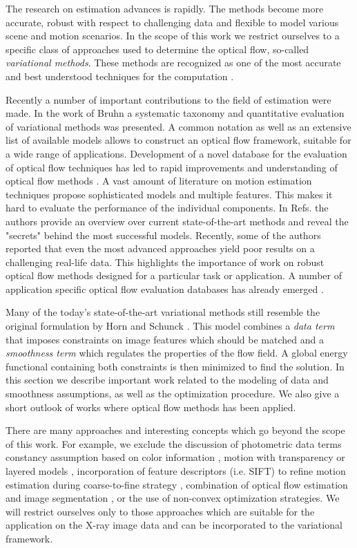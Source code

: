 The research on \opticalflow estimation advances is rapidly. The methods become more accurate, robust with respect to challenging data and flexible to model various scene and motion scenarios. In the scope of this work we restrict ourselves to a specific class of approaches used to determine the optical flow, so-called \textit{variational methods}. These methods are recognized as one of the most accurate and best understood techniques for the \opticalflow computation \cite{Middl, Sun14}. 

Recently a number of important contributions to the field of \opticalflow estimation were made. In the work of Bruhn \cite{BruhnThesis} a systematic taxonomy and quantitative evaluation of variational \opticalflow methods was presented. A common notation as well as an extensive list of available models allows to construct an optical flow framework, suitable for a wide range of applications. 
Development of a novel database for the evaluation of optical flow techniques has led to rapid improvements and understanding of optical flow methods \cite{Middl} . 
A vast amount of literature on motion estimation techniques propose sophisticated models and multiple features. This  makes it hard to evaluate the performance of the individual components. In Refs. \cite{Sun10, Sun14} the authors provide an overview over current state-of-the-art \opticalflow methods and reveal the "secrets" behind the most successful models.
Recently, some of the authors reported that even the most advanced approaches yield poor results on a challenging real-life data. This highlights the importance of work on  robust optical flow methods designed for a particular task or application. A number of application specific optical flow evaluation databases has already emerged \cite{Adato07, Geiger12}.

Many of the today's state-of-the-art variational \opticalflow methods still resemble the original
formulation by Horn and Schunck \cite{HornSchunck81}. This model combines a \textit{data term} that imposes constraints on image features which should be matched and a \textit{smoothness term} which regulates the properties of the flow field. A global energy functional containing both constraints is then minimized to find the solution. In this section we describe important work related to the modeling of data and smoothness assumptions, as well as the optimization procedure.  We also give a short outlook of works where optical flow methods has been applied.

There are many approaches and interesting concepts which go beyond the scope of this work. For example, we exclude the discussion of photometric data terms constancy assumption based on color information \cite{Mileva07},  motion with transparency or layered models \cite{Jepson93, Wang93, Ju96},  incorporation of feature descriptors (i.e. SIFT) to refine motion estimation during coarse-to-fine strategy \cite{Xu10},  combination of optical flow estimation and image segmentation \cite{Black96b, Zitnick05, Xu08}, or the use of non-convex optimization strategies.  We will restrict ourselves only to those approaches which are suitable for the application on the X-ray image data and can be incorporated to the variational framework. 

